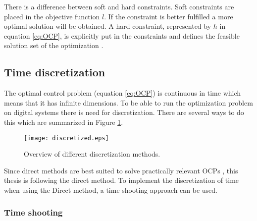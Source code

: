 There is a difference between soft and hard constraints. Soft constraints are placed in the objective function $l$. If the constraint is better fulfilled a more optimal solution will be obtained. A hard constraint, represented by $h$ in equation \ref{eq:OCP}, is explicitly put in the constraints and defines the feasible solution set of the optimization \cite{Yankov}.\\

\subsection{Time discretization}

The optimal control problem (equation \ref{eq:OCP}) is continuous in time which means that it has infinite dimensions. To be able to run the optimization problem on digital systems there is need for discretization. There are several ways to do this which are summarized in Figure \ref{fig:discretization_m}.
\begin{figure}[htp]
	\centering
	\texttt{[image: discretized.eps]}
	\caption{Overview of different discretization methods.}
	\label{fig:discretization_m}
\end{figure}

Since direct methods are best suited to solve practically relevant OCPs \cite{Mercy2018}, this thesis is following the direct method. To implement the discretization of time when using the Direct method, a time shooting approach can be used.

\subsubsection*{Time shooting}

